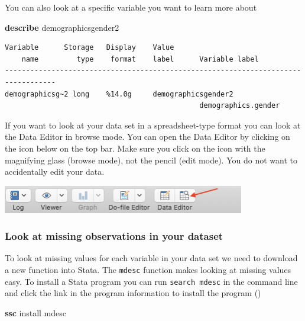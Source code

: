 \documentclass[
]{book}
\newenvironment{Shaded}{\begin{snugshade}}{\end{snugshade}}
\newcommand{\KeywordTok}[1]{\textcolor[rgb]{0.13,0.29,0.53}{\textbf{#1}}}
\newcommand{\NormalTok}[1]{#1}
\begin{document}
You can also look at a specific variable you want to learn more about

\begin{Shaded}
\begin{Highlighting}[]
\KeywordTok{describe}\NormalTok{ demographicsgender2}
\end{Highlighting}
\end{Shaded}

\begin{verbatim}
Variable      Storage   Display    Value
    name         type    format    label      Variable label
----------------------------------------------------------------------------------
demographicsg~2 long    %14.0g     demographicsgender2
                                              demographics.gender
\end{verbatim}

If you want to look at your data set in a spreadsheet-type format you can look at the Data Editor in browse mode. You can open the Data Editor by clicking on the icon below on the top bar. Make sure you click on the icon with the magnifying glass (browse mode), not the pencil (edit mode). You do not want to accidentally edit your data.

\includegraphics[width=4.16667in,height=\textheight]{images/data_editor.png}

\hypertarget{mdesc}{%
\subsubsection*{Look at missing observations in your dataset}\label{mdesc}}

To look at missing values for each variable in your data set we need to download a new function into Stata. The \texttt{mdesc} function makes looking at missing values easy. To install a Stata program you can run \texttt{search\ mdesc} in the command line and click the link in the program information to install the program ()

\begin{Shaded}
\begin{Highlighting}[]
\KeywordTok{ssc}\NormalTok{ install mdesc}
\end{Highlighting}
\end{Shaded}
\end{document}

